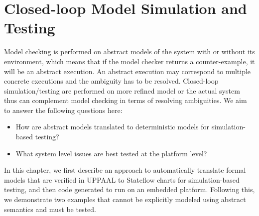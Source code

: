 \chapter{Closed-loop Model Simulation and Testing}
Model checking is performed on abstract models of the system with or without its environment, which means that if the model checker returns a counter-example, it will be an abstract execution. An abstract execution may correspond to multiple concrete executions and the ambiguity has to be resolved. Closed-loop simulation/testing are performed on more refined model or the actual system thus can complement model checking in terms of resolving ambiguities. We aim to answer the following questions here:

\begin{itemize}
	\vspace{-5pt}
	\item How are abstract models translated to deterministic models for simulation-based testing?
	\vspace{-5pt}
	\item What system level issues are best tested at the platform level?
\end{itemize}

In this chapter, we first describe an approach to automatically translate formal models that are verified in UPPAAL to Stateflow charts for simulation-based testing, and then code generated to run on an embedded platform. Following this, we demonstrate two examples that cannot be explicitly modeled using abstract semantics and must be tested.


